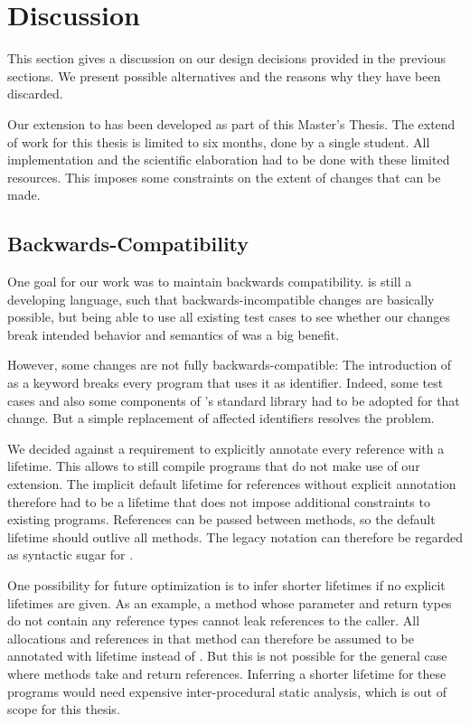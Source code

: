 \section{Discussion}\label{section:design-discussion}

This section gives a discussion on our design decisions provided in the previous sections.
We present possible alternatives and the reasons why they have been discarded.

Our extension to \whiley has been developed as part of this Master's Thesis.
The extend of work for this thesis is limited to six months, done by a single student.
All implementation and the scientific elaboration had to be done with these limited resources.
This imposes some constraints on the extent of changes that can be made.


\subsection{Backwards-Compatibility}

One goal for our work was to maintain backwards compatibility.
\whiley is still a developing language, such that backwards-incompatible changes are basically possible, but being able to use all existing test cases to see whether our changes break intended behavior and semantics of \whiley was a big benefit.

However, some changes are not fully backwards-compatible:
The introduction of  as a keyword breaks every program that uses it as identifier.
Indeed, some test cases and also some components of \whiley's standard library had to be adopted for that change.
But a simple replacement of affected identifiers resolves the problem.

We decided against a requirement to explicitly annotate every reference with a lifetime.
This allows to still compile programs that do not make use of our extension.
The implicit default lifetime for references without explicit annotation therefore had to be a lifetime that does not impose additional constraints to existing programs.
References can be passed between methods, so the default lifetime should outlive all methods.
The legacy notation  can therefore be regarded as syntactic sugar for .

One possibility for future optimization is to infer shorter lifetimes if no explicit lifetimes are given.
As an example, a method whose parameter and return types do not contain any reference types cannot leak references to the caller.
All allocations and references in that method can therefore be assumed to be annotated with lifetime  instead of \whileyinline{*}.
But this is not possible for the general case where methods take and return references.
Inferring a shorter lifetime for these programs would need expensive inter-procedural static analysis, which is out of scope for this thesis.


